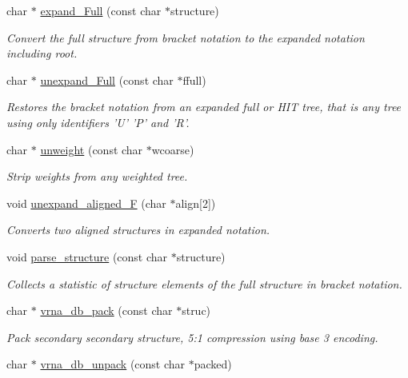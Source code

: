 \begin{DoxyCompactItemize}
char $\ast$ \hyperlink{group__struct__utils_ga78d73cd54a068ef2812812771cdddc6f}{expand\-\_\-\-Full} (const char $\ast$structure)
\begin{DoxyCompactList}\small\item\em Convert the full structure from bracket notation to the expanded notation including root. \end{DoxyCompactList}\item 
char $\ast$ \hyperlink{group__struct__utils_ga260c4b622093b76a883bf96628280de1}{unexpand\-\_\-\-Full} (const char $\ast$ffull)
\begin{DoxyCompactList}\small\item\em Restores the bracket notation from an expanded full or H\-I\-T tree, that is any tree using only identifiers 'U' 'P' and 'R'. \end{DoxyCompactList}\item 
char $\ast$ \hyperlink{group__struct__utils_ga09a80253ac7b6bae606871ba7c6e5136}{unweight} (const char $\ast$wcoarse)
\begin{DoxyCompactList}\small\item\em Strip weights from any weighted tree. \end{DoxyCompactList}\item 
void \hyperlink{group__struct__utils_ga1054c4477d53b31d79d4cb132100e87a}{unexpand\-\_\-aligned\-\_\-\-F} (char $\ast$align\mbox{[}2\mbox{]})
\begin{DoxyCompactList}\small\item\em Converts two aligned structures in expanded notation. \end{DoxyCompactList}\item 
void \hyperlink{group__struct__utils_ga3c79042e6bf6f01706bf30ec9e69e8ac}{parse\-\_\-structure} (const char $\ast$structure)
\begin{DoxyCompactList}\small\item\em Collects a statistic of structure elements of the full structure in bracket notation. \end{DoxyCompactList}\item 
char $\ast$ \hyperlink{group__struct__utils_ga55c4783060a1464f862f858d5599c9e1}{vrna\-\_\-db\-\_\-pack} (const char $\ast$struc)
\begin{DoxyCompactList}\small\item\em Pack secondary secondary structure, 5\-:1 compression using base 3 encoding. \end{DoxyCompactList}\item 
char $\ast$ \hyperlink{group__struct__utils_ga6490adff857d84ce06e6f379ae3a4512}{vrna\-\_\-db\-\_\-unpack} (const char $\ast$packed)

\end{DoxyCompactItemize}
